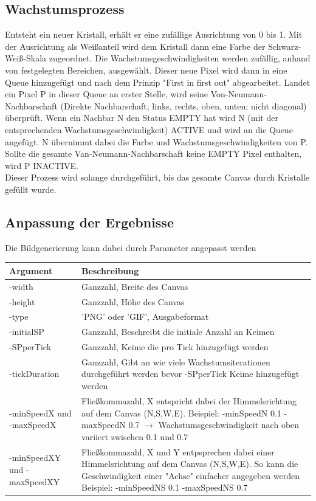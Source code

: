 \documentclass[a4paper,10pt,ngerman]{scrartcl}
\begin{document}
\subsection{Wachstumsprozess}
Entsteht ein neuer Kristall, erhält er eine zufällige Ausrichtung von 0 bis 1. Mit der Ausrichtung als Weißanteil wird dem Kristall dann eine Farbe der Schwarz-Weiß-Skala zugeordnet. Die Wachstumsgeschwindigkeiten werden zufällig, anhand von festgelegten Bereichen, ausgewählt. Dieser neue Pixel wird dann in eine Queue hinzugefügt und nach dem Prinzip "First in first out" abgearbeitet. Landet ein Pixel P in dieser Queue an erster Stelle, wird seine Von-Neumann-Nachbarschaft (Direkte Nachbarschaft; links, rechts, oben, unten; nicht diagonal) überprüft. Wenn ein Nachbar N den Status EMPTY hat wird N (mit der entsprechenden Wachstumsgeschwindigkeit) ACTIVE und wird an die Queue angefügt. N übernimmt dabei die Farbe und Wachstumsgeschwindigkeiten von P. \\
Sollte die gesamte Van-Neumann-Nachbarschaft keine EMPTY Pixel enthalten, wird P INACTIVE. \\
Dieser Prozess wird solange durchgeführt, bis das gesamte Canvas durch Kristalle gefüllt wurde.
\subsection{Anpassung der Ergebnisse}
Die Bildgenerierung kann dabei durch Parameter angepasst werden \\
\begin{tabular}{|p{3cm}|p{13cm}|}
\hline 
\rule[-1ex]{0pt}{2.5ex} Argument & Beschreibung \\ 
\hline 
\rule[-1ex]{0pt}{2.5ex} -width & Ganzzahl, Breite des Canvas \\ 
\hline 
\rule[-1ex]{0pt}{2.5ex} -height & Ganzzahl, Höhe des Canvas \\ 
\hline 
\rule[-1ex]{0pt}{2.5ex} -type & 'PNG' oder 'GIF', Ausgabeformat \\ 
\hline 
\rule[-1ex]{0pt}{2.5ex} -initialSP & Ganzzahl, Beschreibt die initiale Anzahl an Keimen \\ 
\hline 
\rule[-1ex]{0pt}{2.5ex} -SPperTick & Ganzzahl, Keime die pro Tick hinzugefügt werden \\ 
\hline 
\rule[-1ex]{0pt}{2.5ex} -tickDuration & Ganzzahl, Gibt an wie viele Wachstumsiterationen durchgeführt werden bevor -SPperTick Keime hinzugefügt werden \\ 
\hline 
\rule[-1ex]{0pt}{2.5ex} -minSpeedX und -maxSpeedX & Fließkommazahl, X entspricht dabei der Himmelsrichtung auf dem Canvas (N,S,W,E). Beispiel: -minSpeedN 0.1 -maxSpeedN 0.7 $\rightarrow$ Wachstumsgeschwindigkeit nach oben variiert zwischen 0.1 und 0.7 \\ 
\hline 
\rule[-1ex]{0pt}{2.5ex} -minSpeedXY und -maxSpeedXY & Fließkommazahl, X und Y entpsprechen dabei einer Himmelsrichtung auf dem Canvas (N,S,W,E). So kann die Geschwindigkeit einer "Achse" einfacher angegeben werden Beispiel: -minSpeedNS 0.1 -maxSpeedNS 0.7 \\ 
\hline 
\end{tabular} \\
\end{document}
